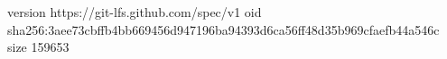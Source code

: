 version https://git-lfs.github.com/spec/v1
oid sha256:3aee73cbffb4bb669456d947196ba94393d6ca56ff48d35b969cfaefb44a546c
size 159653
